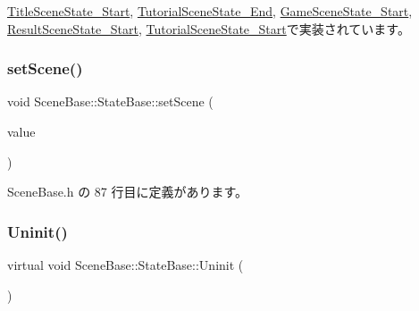 \mbox{\hyperlink{class_title_scene_state___start_af4dfe902a4391ca8f0cff5d1aa9507f8}{Title\+Scene\+State\+\_\+\+Start}}, \mbox{\hyperlink{class_tutorial_scene_state___end_ada1a87235a021b40f8eca96e31879227}{Tutorial\+Scene\+State\+\_\+\+End}}, \mbox{\hyperlink{class_game_scene_state___start_a59270f7b65613f580864ed8ea3056179}{Game\+Scene\+State\+\_\+\+Start}}, \mbox{\hyperlink{class_result_scene_state___start_a8f776a7b2d31451c434fb74ffdd65960}{Result\+Scene\+State\+\_\+\+Start}}, \mbox{\hyperlink{class_tutorial_scene_state___start_a40bfdf7acd93b619138bf708adff31e4}{Tutorial\+Scene\+State\+\_\+\+Start}}で実装されています。

\mbox{\label{class_scene_base_1_1_state_base_adfb19da59b938832387aa10528bedb44}} 
\subsubsection{\texorpdfstring{set\+Scene()}{setScene()}}
{\footnotesize\ttfamily void Scene\+Base\+::\+State\+Base\+::set\+Scene (\begin{DoxyParamCaption}\item[{\mbox{\hyperlink{class_scene_base}{Scene\+Base}} $\ast$}]{value }\end{DoxyParamCaption})\hspace{0.3cm}{\ttfamily [inline]}}



 Scene\+Base.\+h の 87 行目に定義があります。

\mbox{\label{class_scene_base_1_1_state_base_a2763fa37e45b39bd8d3bbb735c76c59b}} 
\subsubsection{\texorpdfstring{Uninit()}{Uninit()}}
{\footnotesize\ttfamily virtual void Scene\+Base\+::\+State\+Base\+::\+Uninit (\begin{DoxyParamCaption}{ }\end{DoxyParamCaption})\hspace{0.3cm}{\ttfamily [pure virtual]}}



